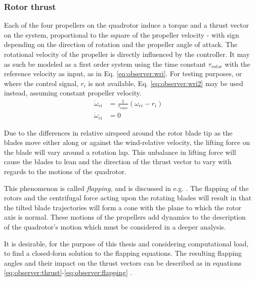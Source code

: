 \subsubsection{Rotor thrust}
\label{ssec:observer:thrust}
    Each of the four propellers on the quadrotor induce a torque
    and a thrust vector on the system, proportional to the square of the
    propeller velocity - with sign depending on the direction of rotation
    and the propeller angle of attack.
    The rotational velocity of the propeller is directly
    influenced by the controller. It may as such be modeled as a first order
    system using the time constant $\tau_{rotor}$ with
    the reference velocity as input, as in Eq. \eqref{eq:observer:wri}.
    For testing purposes, or where the control signal, $r_{i}$ is not
    available, Eq. \eqref{eq:observer:wri2} may be used instead,
    assuming constant propeller velocity.
    \begin{align}
        \dot{\omega}_{ri} &= \frac{1}{\tau_{rotor}} \left( \omega_{ri} - r_{i} \right) \label{eq:observer:wri} \\
        \dot{\omega}_{ri} &= 0 \label{eq:observer:wri2}
    \end{align}

    Due to the differences in relative airspeed around
    the rotor blade tip as the blades move either along or against
    the wind-relative velocity, the lifting force on the blade will vary
    around a rotation lap.
    This unbalance in lifting force will cause the blades to lean and the
    direction of the thrust vector to vary with regards to the motions of the quadrotor.

    This phenomenon is called \textit{flapping}, and is discussed
    in e.g. \citep{Pounds_modellingand}. The flapping of the rotors
    and the centrifugal force acting upon the rotating blades
    will result in that the tilted blade trajectories will
    form a cone with the plane to which the rotor axis is normal.
    These motions of the propellers add dynamics to the
    description of the quadrotor's motion which must be considered in a deeper analysis.

    It is desirable, for the purpose of this thesis and
    considering computational load, to find a closed-form
    solution to the flapping equations.
    The resulting flapping angles and their impact on
    the thrust vectors can be described as in equations
    \eqref{eq:observer:thrust}-\eqref{eq:observer:flapping}
    \citep{Pounds_modellingand,prouty1995helicopter,leishman2002principles}.

